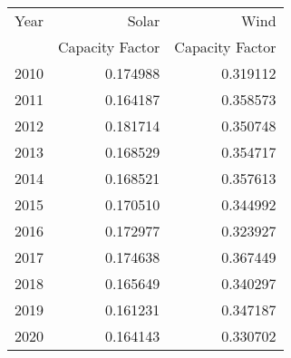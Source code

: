 \begin{tabular}{lrr}
\toprule
Year &  Solar &   Wind \\
    &  Capacity Factor    &  Capacity Factor \\
\midrule
2010 &  0.174988 &  0.319112 \\
2011 &  0.164187 &  0.358573 \\
2012 &  0.181714 &  0.350748 \\
2013 &  0.168529 &  0.354717 \\
2014 &  0.168521 &  0.357613 \\
2015 &  0.170510 &  0.344992 \\
2016 &  0.172977 &  0.323927 \\
2017 &  0.174638 &  0.367449 \\
2018 &  0.165649 &  0.340297 \\
2019 &  0.161231 &  0.347187 \\
2020 &  0.164143 &  0.330702 \\
\bottomrule
\end{tabular}
